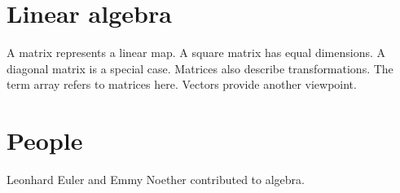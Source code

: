\usepackage{imakeidx}
\makeindex[title={Subject index},intoc]
\makeindex[name=people,title={People}]

\section*{Linear algebra}
A matrix represents a linear map.
A square matrix has equal dimensions.
A diagonal matrix is a special case.
Matrices also describe transformations.
The term array refers to matrices here.
Vectors provide another viewpoint.

\section*{People}
Leonhard Euler and
Emmy Noether contributed to algebra.

\printindex
\printindex[people]
